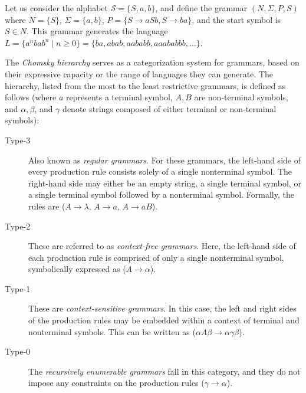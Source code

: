 \begin{example}
\label{ex:context_free_grammar}
Let us consider the alphabet $\mathcal{S} = \{ S, a, b \}$, and define the grammar $(N, \Sigma, P, S)$ where $N = \{ S \}$, $\Sigma = \{ a, b \}$, $P = \{ S \rightarrow aSb, S \rightarrow ba \}$, and the start symbol is $S \in N$. This grammar generates the language $L = \{ a^nbab^n \mid n\geq0 \} = \{ ba, abab, aababb, aaababbb, \ldots \}$.
\end{example}

The \emph{Chomsky hierarchy} serves as a categorization system for grammars, based on their expressive capacity or the range of languages they can generate. The hierarchy, listed from the most to the least restrictive grammars, is defined as follows (where $a$ represents a terminal symbol, $A, B$ are non-terminal symbols, and $\alpha, \beta$, and $\gamma$ denote strings composed of either terminal or non-terminal symbols):

\begin{description}
\item[Type-3] Also known as \emph{regular grammars}. For these grammars, the left-hand side of every production rule consists solely of a single nonterminal symbol. The right-hand side may either be an empty string, a single terminal symbol, or a single terminal symbol followed by a nonterminal symbol. Formally, the rules are ($A \rightarrow \lambda$, $A \rightarrow a$, $A \rightarrow aB$).

\item[Type-2] These are referred to as \emph{context-free grammars}. Here, the left-hand side of each production rule is comprised of only a single nonterminal symbol, symbolically expressed as ($A \rightarrow \alpha$).

\item[Type-1] These are \emph{context-sensitive grammars}. In this case, the left and right sides of the production rules may be embedded within a context of terminal and nonterminal symbols. This can be written as ($\alpha A \beta \rightarrow \alpha \gamma \beta$).

\item[Type-0] The \emph{recursively enumerable grammars} fall in this category, and they do not impose any constraints on the production rules ($\gamma \rightarrow \alpha$).
\end{description}


